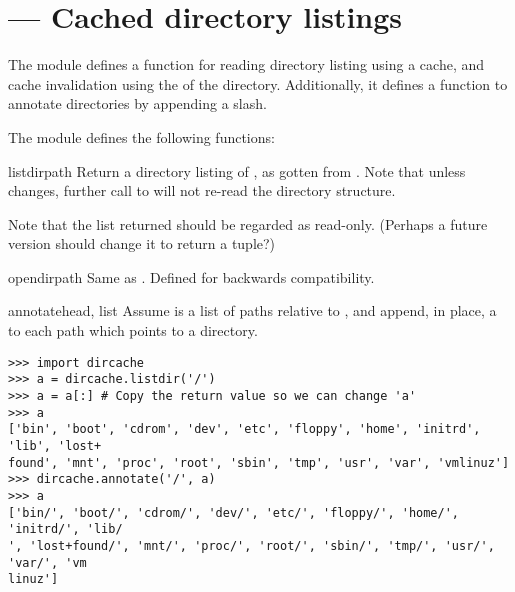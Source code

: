 \section{ ---
         Cached directory listings}


The  module defines a function for reading directory listing
using a cache, and cache invalidation using the  of the directory.
Additionally, it defines a function to annotate directories by appending
a slash.

The  module defines the following functions:

\begin{funcdesc}{listdir}{path}
Return a directory listing of , as gotten from
. Note that unless  changes, further call
to  will not re-read the directory structure.

Note that the list returned should be regarded as read-only. (Perhaps
a future version should change it to return a tuple?)
\end{funcdesc}

\begin{funcdesc}{opendir}{path}
Same as . Defined for backwards compatibility.
\end{funcdesc}

\begin{funcdesc}{annotate}{head, list}
Assume  is a list of paths relative to , and append,
in place, a \character{/} to each path which points to a directory.
\end{funcdesc}

\begin{verbatim}
>>> import dircache
>>> a = dircache.listdir('/')
>>> a = a[:] # Copy the return value so we can change 'a'
>>> a
['bin', 'boot', 'cdrom', 'dev', 'etc', 'floppy', 'home', 'initrd', 'lib', 'lost+
found', 'mnt', 'proc', 'root', 'sbin', 'tmp', 'usr', 'var', 'vmlinuz']
>>> dircache.annotate('/', a)
>>> a
['bin/', 'boot/', 'cdrom/', 'dev/', 'etc/', 'floppy/', 'home/', 'initrd/', 'lib/
', 'lost+found/', 'mnt/', 'proc/', 'root/', 'sbin/', 'tmp/', 'usr/', 'var/', 'vm
linuz']
\end{verbatim}
